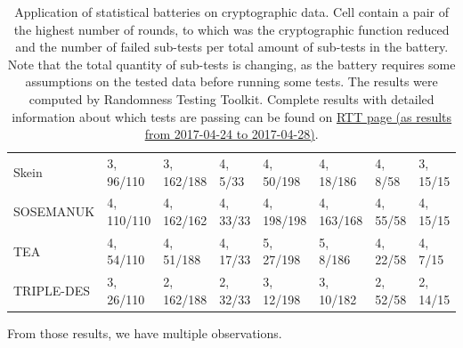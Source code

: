 \documentclass[
  print, %
  Table,   %
  nolof,     %
  nolot,     %
  11pt, %
  oneside  %
]{fithesis3}
\begin{document}
\begin{table}[H]
\begin{tabular}{l|p{1.8cm} p{1.8cm} p{1.8cm} p{1.8cm} p{1.8cm} p{1.8cm} p{1.8cm}}
Skein       & 3, 96/110 & 3, 162/188& 4, 5/33           & 4, 50/198                 & 4, 18/186     & 4, 8/58           & 3, 15/15              \\
SOSEMANUK   & 4, 110/110& 4, 162/162& 4, 33/33          & 4, 198/198                & 4, 163/168    & 4, 55/58          & 4, 15/15              \\
TEA         & 4, 54/110 & 4, 51/188 & 4, 17/33          & 5, 27/198                 & 5, 8/186      & 4, 22/58          & 4, 7/15               \\
TRIPLE-DES  & 3, 26/110 & 2, 162/188& 2, 32/33          & 3, 12/198                 & 3, 10/182     & 2, 52/58          & 2, 14/15              
\end{tabular}
\caption{Application of statistical batteries on cryptographic data. Cell contain a pair of the highest number of rounds, to which was the cryptographic function reduced and the number of failed sub-tests per total amount of sub-tests in the battery. Note that the total quantity of sub-tests is changing, as the battery requires some assumptions on the tested data before running some tests. The results were computed by Randomness Testing Toolkit. Complete results with detailed information about which tests are passing can be found on \href{http://rtt.ics.muni.cz/ViewResults/?created_from=2017-04-24+12\%3A00\%3A00&created_to=2017-04-29+00\%3A00\%3A00}{RTT page (as results from 2017-04-24 to 2017-04-28)}.}
\label{table:res-batteries}
\end{table}

From those results, we have multiple observations.
\end{document}
